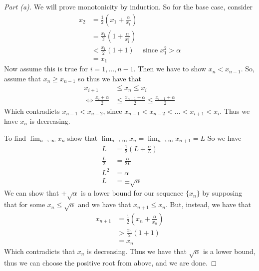 \documentclass[leqno]{article}
\theoremstyle{nonumberplain}
\newtheorem{proof}{Proof}
\begin{document}
\begin{proof}[Part (a)]
We will prove monotonicity by induction.  So for the base case, consider 
\begin{align*}
x_2&=\frac{1}{2}\left( x_1 + \frac{\alpha}{x_1}\right)\\
&= \frac{x_1}{2}\left(1+\frac{\alpha}{x_1^2}\right)\\
&<\frac{x_1}{2}(1+1)&\textrm{since $x_1^2>\alpha$}\\
&=x_1
\end{align*}
Now assume this is true for $i=1,...,n-1$. Then we have to show $x_n<x_{n-1}$. So, assume that $x_n\geq x_{n-1}$ so thus we have that
\begin{align*}
x_{i+1}&\leq x_n\leq x_{i}\\
\iff \frac{x_i+\alpha}{2}&\leq \frac{x_{n-1}+\alpha}{2}\leq \frac{x_{i-1}+\alpha}{2}
\end{align*}
Which contradicts $x_{n-1}<x_{n-2}$, since $x_{n-1}<x_{n-2}<...<x_{i+1}<x_{i}$. Thus we have $x_n$ is decreasing. 

To find $\lim_{n\to \infty}x_n$ show that $\lim_{n\to \infty}x_n=\lim_{n\to \infty}x_{n+1}=L$ So we have
\begin{align*}
L&=\frac{1}{2}\left(L+\frac{\alpha}{L}\right)\\
\frac{L}{2}&=\frac{\alpha}{2L}\\
L^2&=\alpha\\
L&=\pm \sqrt{\alpha}
\end{align*}
We can show that $+\sqrt{\alpha}$ is a lower bound for our sequence $\{x_n\}$ by supposing that for some $x_{n}\leq \sqrt{\alpha}$ and we have that $x_{n+1}\leq x_n$. But, instead, we have that
\begin{align*}
x_{n+1}&=\frac{1}{2}\left(x_n+\frac{\alpha}{x_n}\right)\\
&>\frac{x_n}{2}\left(1+1\right)\\
&=x_n
\end{align*}
Which contradicts that $x_n$ is decreasing.  Thus we have that $\sqrt{\alpha}$ is a lower bound, thus we can choose the positive root from above, and we are done.
\end{proof}
\end{document}
